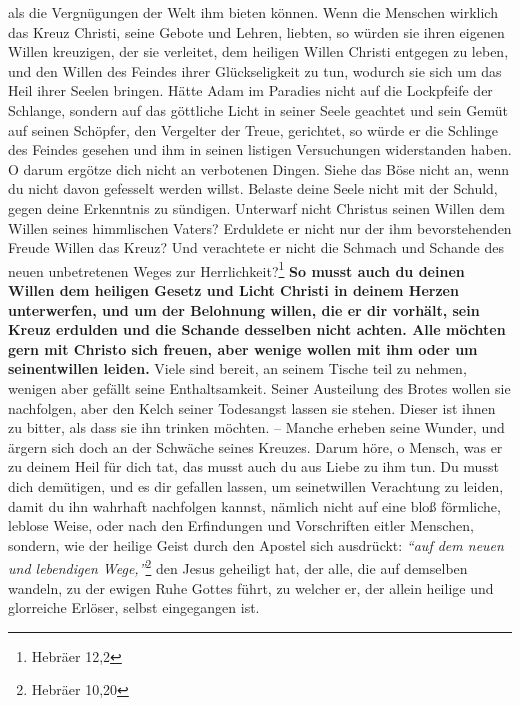 als die Vergnügungen der
Welt ihm bieten können. Wenn die Menschen wirklich das Kreuz
Christi, seine
Gebote und Lehren, liebten, so würden sie ihren eigenen Willen
kreuzigen, der
sie verleitet, dem heiligen Willen Christi entgegen zu leben, und den Willen des
Feindes ihrer Glückseligkeit zu tun, wodurch sie sich um
das Heil ihrer Seelen
bringen. Hätte Adam im Paradies
nicht auf die Lockpfeife der Schlange, sondern
auf das göttliche Licht in seiner Seele geachtet und sein Gemüt auf seinen
Schöpfer, den Vergelter der Treue, gerichtet, so würde er die Schlinge des
Feindes gesehen und ihm in seinen listigen Versuchungen widerstanden haben. O
darum ergötze dich nicht an verbotenen Dingen. Siehe das Böse nicht
an, wenn du
nicht davon gefesselt werden willst. Belaste deine Seele nicht mit der Schuld,
gegen deine Erkenntnis zu sündigen. Unterwarf nicht Christus seinen Willen dem
Willen seines himmlischen Vaters? Erduldete er nicht nur der ihm bevorstehenden
Freude Willen das Kreuz? Und verachtete er nicht die
Schmach und Schande des
neuen unbetretenen Weges zur Herrlichkeit?\footnote{Hebräer 12,2}
\label{ref:12_11_opfer} \textbf{So musst auch du
deinen Willen dem heiligen Gesetz und Licht
Christi in deinem Herzen
unterwerfen, und um der Belohnung willen, die er dir vorhält,
sein Kreuz erdulden und die Schande desselben nicht achten. Alle möchten gern
mit Christo
sich freuen, aber wenige wollen mit ihm oder um seinentwillen
leiden.} Viele sind
bereit, an seinem Tische teil zu nehmen, wenigen aber gefällt seine
Enthaltsamkeit. Seiner Austeilung des Brotes wollen sie
nachfolgen, aber den
Kelch seiner Todesangst lassen sie stehen. Dieser ist
ihnen zu bitter, als dass
sie ihn trinken möchten. -- Manche erheben seine Wunder, und
ärgern sich doch an
der Schwäche seines Kreuzes. Darum höre, o Mensch, was
er zu deinem Heil für
dich tat, das musst auch du aus Liebe zu ihm tun. Du musst dich demütigen, und
es dir gefallen lassen, um seinetwillen Verachtung zu leiden, damit du ihn
wahrhaft nachfolgen kannst, nämlich nicht auf eine bloß
förmliche, leblose Weise, oder nach den Erfindungen und
Vorschriften eitler Menschen, sondern, wie
der heilige Geist durch den Apostel sich ausdrückt:
\textit{"`auf dem neuen und
lebendigen Wege,"'}\footnote{Hebräer 10,20}
den Jesus geheiligt hat, der alle, die
auf demselben wandeln, zu der ewigen Ruhe Gottes führt, zu
welcher er, der
allein heilige und glorreiche Erlöser, selbst eingegangen ist.




